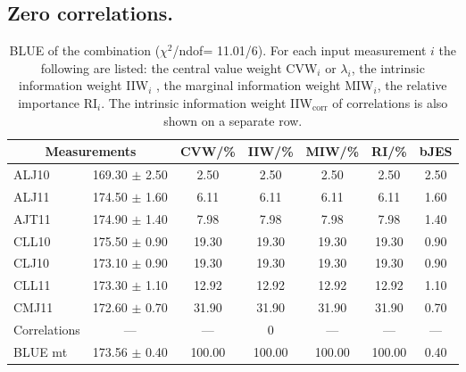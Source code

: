 \subsection{Zero correlations.}
\begin{table}[H]
\scriptsize
\begin{center}
\renewcommand{\arraystretch}{1.1}
\begin{tabular}{|lc|c|c|c|c|c|}
\hline
\multicolumn{2}{|c|}{Measurements} & CVW/\%  & IIW/\%  & MIW/\%  & RI/\%  & {\tiny bJES}\\
\hline
ALJ10 &     169.30 $\pm$       2.50 &       2.50 &       2.50 &       2.50 &       2.50 &       2.50\\
ALJ11 &     174.50 $\pm$       1.60 &       6.11 &       6.11 &       6.11 &       6.11 &       1.60\\
AJT11 &     174.90 $\pm$       1.40 &       7.98 &       7.98 &       7.98 &       7.98 &       1.40\\
CLL10 &     175.50 $\pm$       0.90 &      19.30 &      19.30 &      19.30 &      19.30 &       0.90\\
CLJ10 &     173.10 $\pm$       0.90 &      19.30 &      19.30 &      19.30 &      19.30 &       0.90\\
CLL11 &     173.30 $\pm$       1.10 &      12.92 &      12.92 &      12.92 &      12.92 &       1.10\\
CMJ11 &     172.60 $\pm$       0.70 &      31.90 &      31.90 &      31.90 &      31.90 &       0.70\\
Correlations & --- & --- &  0 & --- & --- & ---\\
\hline
BLUE {\tiny mt} &     173.56 $\pm$       0.40 &     100.00 &     100.00 &     100.00 &     100.00 &       0.40\\
\hline
\end{tabular}
\caption{BLUE of the combination ($\chi^2$/ndof=     11.01/6).
 For each input measurement $i$ the following are listed: the central value weight CVW$_i$ or $\lambda_i$, the intrinsic information weight IIW$_i$ , the marginal information weight MIW$_i$, the relative importance RI$_i$. The intrinsic information weight IIW$_{\mathrm{corr}}$ of correlations is also shown on a separate row.}
\renewcommand{\arraystretch}{1}
\end{center}
\end{table}
